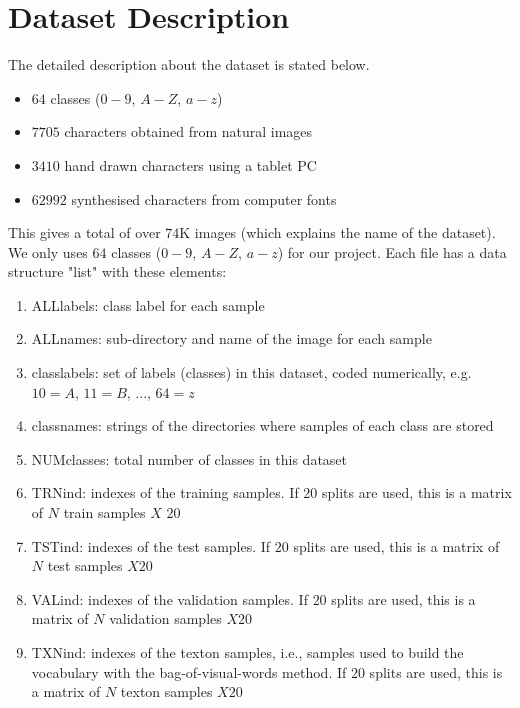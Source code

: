 \documentclass{article}
\begin{document}
\section{Dataset Description}
The detailed description about the dataset is stated below.
\begin{itemize}
  \item $64$ classes ($0-9$, $A-Z$, $a-z$)
  \item $7705$ characters obtained from natural images
  \item $3410$ hand drawn characters using a tablet PC
  \item $62992$ synthesised characters from computer fonts
\end{itemize}
This gives a total of over $74$K images (which explains the name of the dataset).
We only uses $64$ classes ($0-9$, $A-Z$, $a-z$) for our project.
Each file has a data structure "list" with these elements:
\begin{enumerate}
\item ALLlabels: class label for each sample
\item ALLnames: sub-directory and name of the image for each sample
\item classlabels: set of labels (classes) in this dataset, coded numerically, e.g. $10=A$, $11=B$, ..., $64=z$
\item classnames: strings of the directories where samples of each class are stored
\item NUMclasses: total number of classes in this dataset
\item TRNind: indexes of the training samples. If $20$ splits are used, this is a matrix of $N$ train samples $X$ $20$
\item TSTind: indexes of the test samples. If $20$ splits are used, this is a matrix of $N$ test samples $X 20$
\item VALind: indexes of the validation samples. If $20$ splits are used, this is a matrix of $N$ validation samples $X 20$
\item TXNind: indexes of the texton samples, i.e., samples used to build the vocabulary with the bag-of-visual-words method. If $20$ splits are used, this is a matrix of $N$ texton samples $X 20$
\end{enumerate}



\end{document}
